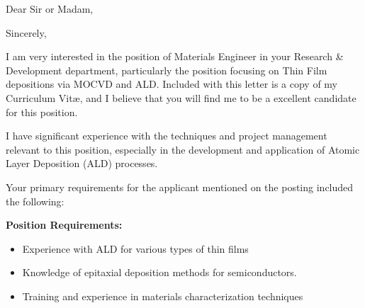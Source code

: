 \documentclass[10pt,letterpaper,sans]{moderncv}
\begin{document}
\closesection{}                   %
\renewcommand{\listitemsymbol}{-} %




%



\newpage
{}
\recomputelengths
\date{\today}
\opening{Dear Sir or Madam,}
\closing{\vspace{1em}Sincerely,\vspace{-0.5cm}}
\makelettertitle

I am very interested in the position of Materials Engineer in your Research \& Development department, particularly the position focusing on Thin Film depositions via MOCVD and ALD. Included with this letter is a copy of my Curriculum Vit\ae{}, and I believe that you will find me to be a excellent candidate for this position. 

I have significant experience with the techniques and project management relevant to this position, especially in the development and application of Atomic Layer Deposition (ALD) processes. 

\vspace{1.5em}
Your primary requirements for the applicant mentioned on the posting included the following:

\textbf{Position Requirements:}
\begin{itemize}
	\item Experience with ALD for various types of thin films
	\item Knowledge of epitaxial deposition methods for semiconductors.
	\item Training and experience in materials characterization techniques
\end{itemize}
\vspace{1.5em}
\end{document}
